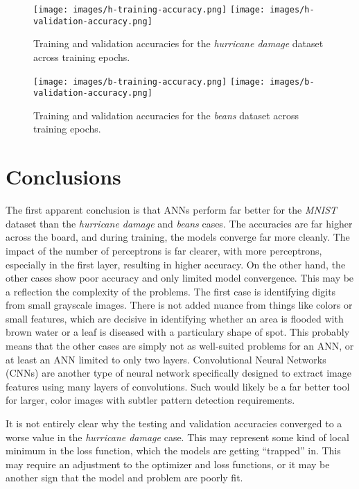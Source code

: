 \documentclass{article}
\begin{document}
\begin{figure}[h!]
	\centering
	\texttt{[image: images/h-training-accuracy.png]}
	\texttt{[image: images/h-validation-accuracy.png]}
	\caption{Training and validation accuracies for the \emph{hurricane damage} dataset across training epochs.}
	\label{fig:h-2l}
\end{figure}

\begin{figure}[h!]
	\centering
	\texttt{[image: images/b-training-accuracy.png]}
	\texttt{[image: images/b-validation-accuracy.png]}
	\caption{Training and validation accuracies for the \emph{beans} dataset across training epochs.}
	\label{fig:b-2l}
\end{figure}

\FloatBarrier

\section{Conclusions}

The first apparent conclusion is that ANNs perform far better for the \emph{MNIST} dataset than the \emph{hurricane damage} and \emph{beans} cases. The accuracies are far higher across the board, and during training, the models converge far more cleanly. The impact of the number of perceptrons is far clearer, with more perceptrons, especially in the first layer, resulting in higher accuracy. On the other hand, the other cases show poor accuracy and only limited model convergence. This may be a reflection the complexity of the problems. The first case is identifying digits from small grayscale images. There is not added nuance from things like colors or small features, which are decisive in identifying whether an area is flooded with brown water or a leaf is diseased with a particulary shape of spot. This probably means that the other cases are simply not as well-suited problems for an ANN, or at least an ANN limited to only two layers. Convolutional Neural Networks (CNNs) are another type of neural network specifically designed to extract image features using many layers of convolutions. Such would likely be a far better tool for larger, color images with subtler pattern detection requirements.

It is not entirely clear why the testing and validation accuracies converged to a worse value in the \emph{hurricane damage} case. This may represent some kind of local minimum in the loss function, which the models are getting ``trapped'' in. This may require an adjustment to the optimizer and loss functions, or it may be another sign that the model and problem are poorly fit.
\end{document}
